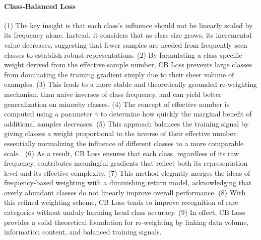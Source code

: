 \paragraph{Class-Balanced Loss}
(1) The key insight is that each class’s influence should not be linearly scaled by its frequency alone. Instead, it considers that as class size grows, its incremental value decreases, suggesting that fewer samples are needed from frequently seen classes to establish robust representations.
(2) By formulating a class-specific weight derived from the effective sample number, CB Loss prevents large classes from dominating the training gradient simply due to their sheer volume of examples.
(3) This leads to a more stable and theoretically grounded re-weighting mechanism than naive inverses of class frequency, and can yield better generalization on minority classes.
(4) The concept of effective number is computed using a parameter $\gamma$ to determine how quickly the marginal benefit of additional samples decreases.
(5) This approach balances the training signal by giving classes a weight proportional to the inverse of their effective number, essentially normalizing the influence of different classes to a more comparable scale \cite{zhang2023deep}.
(6) As a result, CB Loss ensures that each class, regardless of its raw frequency, contributes meaningful gradients that reflect both its representation level and its effective complexity.
(7) This method elegantly merges the ideas of frequency-based weighting with a diminishing return model, acknowledging that overly abundant classes do not linearly improve overall performance.
(8) With this refined weighting scheme, CB Loss tends to improve recognition of rare categories without unduly harming head class accuracy.
(9) In effect, CB Loss provides a solid theoretical foundation for re-weighting by linking data volume, information content, and balanced training signals.

